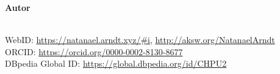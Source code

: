 \begin{flushleft}
  \small
\strut


%
%

\vfill

\textbf{Autor}

\myName\\
WebID: \url{https://natanael.arndt.xyz/#i}, \url{http://aksw.org/NatanaelArndt}\\
ORCID: \url{https://orcid.org/0000-0002-8130-8677}\\
DBpedia Global ID: \url{https://global.dbpedia.org/id/CHPU2}


\end{flushleft}
